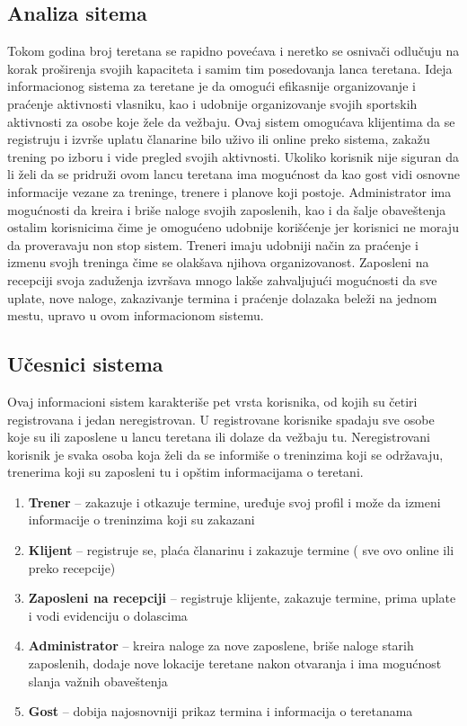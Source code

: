 \documentclass[../main.tex]{subfiles}
\begin{document}
\subsection{Analiza sitema}

Tokom godina broj teretana se rapidno povećava i neretko se osnivači odlučuju na korak proširenja svojih kapaciteta i samim tim posedovanja lanca teretana. Ideja informacionog sistema za teretane je da omogući efikasnije organizovanje i praćenje aktivnosti vlasniku, kao i udobnije organizovanje svojih sportskih aktivnosti za osobe koje žele da vežbaju. Ovaj sistem omogućava klijentima da se registruju i izvrše uplatu članarine bilo uživo ili online preko sistema, zakažu trening po izboru i vide pregled svojih aktivnosti. Ukoliko korisnik nije siguran da li želi da se pridruži ovom lancu teretana ima mogućnost da kao gost vidi osnovne informacije vezane za treninge, trenere i planove koji postoje. Administrator ima mogućnosti da kreira i briše naloge svojih zaposlenih, kao i da šalje obaveštenja ostalim korisnicima čime je omogućeno udobnije korišćenje jer korisnici ne moraju da proveravaju non stop sistem. Treneri imaju udobniji način za praćenje i izmenu svojh treninga čime se olakšava njihova organizovanost. Zaposleni na recepciji svoja zaduženja izvršava mnogo lakše zahvaljujući mogućnosti da sve uplate, nove naloge, zakazivanje termina i praćenje dolazaka beleži na jednom mestu, upravo u ovom informacionom sistemu.

\subsection{Učesnici sistema}
Ovaj informacioni sistem karakteriše pet vrsta korisnika, od kojih su četiri registrovana i jedan neregistrovan. U registrovane korisnike spadaju sve osobe koje su ili zaposlene u lancu teretana ili dolaze da vežbaju tu. Neregistrovani korisnik je svaka osoba koja želi da se informiše o treninzima koji se održavaju, trenerima koji su zaposleni tu i opštim informacijama o teretani.
\begin{enumerate}
  \item \textbf{Trener} – zakazuje i otkazuje termine, uređuje svoj profil i može da izmeni informacije o treninzima koji su zakazani
  \item \textbf{Klijent} – registruje se, plaća članarinu i zakazuje termine ( sve ovo online ili preko recepcije)
  \item  \textbf{Zaposleni na recepciji} – registruje klijente, zakazuje termine, prima uplate i vodi evidenciju o dolascima
  \item \textbf{Administrator} – kreira naloge za nove zaposlene, briše naloge starih zaposlenih, dodaje nove lokacije teretane nakon otvaranja i ima mogućnost slanja važnih obaveštenja
  \item \textbf{Gost} – dobija najosnovniji prikaz termina i informacija o teretanama
\end{enumerate}
\end{document}

